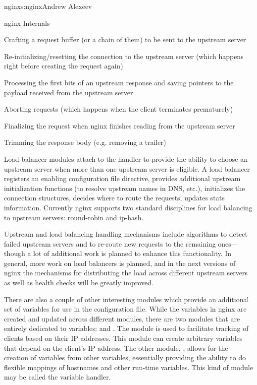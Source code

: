 \begin{aosachapter}{nginx}{s:nginx}{Andrew Alexeev}
\begin{aosasect1}{nginx Internals}
\begin{aosaitemize}

\item Crafting a request buffer (or a chain of them) to be sent to the
  upstream server

\item Re-initializing/resetting the connection to the upstream server
  (which happens right before creating the request again)

\item Processing the first bits of an upstream response and saving
  pointers to the payload received from the upstream server

\item Aborting requests (which happens when the client terminates
  prematurely)

\item Finalizing the request when nginx finishes reading from the
  upstream server

\item Trimming the response body (e.g. removing a trailer)

\end{aosaitemize}

Load balancer modules attach to the  handler to
provide the ability to choose an upstream server when more than one
upstream server is eligible. A load balancer registers an enabling
configuration file directive, provides additional upstream
initialization functions (to resolve upstream names in DNS, etc.),
initializes the connection structures, decides where to route the
requests, updates stats %
information. Currently nginx supports two standard disciplines for
load balancing to upstream servers: round-robin and ip-hash.

Upstream and load balancing handling mechanisms include algorithms to
detect failed upstream servers and to re-route new requests to the
remaining ones---though a lot of additional work is planned to enhance
this functionality. In general, more work on load balancers is
planned, and in the next versions of nginx the mechanisms for
distributing the load across different upstream servers as well as
health checks will be greatly improved.

There are also a couple of other interesting modules which provide an
additional set of variables for use in the configuration file. While
the variables in nginx are created and updated across different
modules, there are two modules that are entirely dedicated to
variables:  and . The  module is used to
facilitate tracking of clients based on their IP addresses. This
module can create arbitrary variables that depend on the client's IP
address. The other module, , allows for the creation of
variables from other variables, essentially providing the ability to
do flexible mappings of hostnames and other run-time variables. This
kind of module may be called the variable handler.


\end{aosasect1}
\end{aosachapter}
